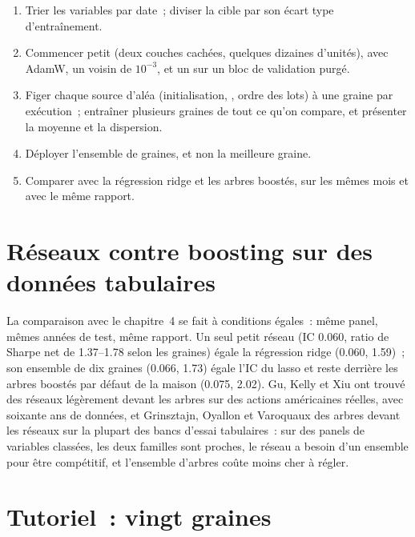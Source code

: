 \begin{method}\label{met:ml:nets:training}
\begin{enumerate}
\item Trier les variables par date~; diviser la cible par son écart type d'entraînement.
\item Commencer petit (deux couches cachées, quelques dizaines d'unités), avec AdamW, un  voisin de $10^{-3}$, et un  sur un
bloc de validation purgé.
\item Figer chaque source d'aléa (initialisation, , ordre des lots) à une graine par exécution~; entraîner plusieurs graines de
tout ce qu'on compare, et présenter la moyenne et la dispersion.
\item Déployer l'ensemble de graines, et non la meilleure graine.
\item Comparer avec la régression ridge et les arbres boostés, sur les mêmes mois et avec le même rapport.
\end{enumerate}
\end{method}

\section{Réseaux contre boosting sur des données tabulaires}

La comparaison avec le chapitre~4 se fait à conditions égales~: même panel, mêmes années de test, même rapport. Un seul petit réseau
(IC 0.060, ratio de Sharpe net de 1.37--1.78 selon les graines) égale la régression ridge (0.060, 1.59)~; son ensemble de dix graines
(0.066, 1.73) égale l'IC du lasso et reste derrière les arbres boostés par défaut de la maison (0.075, 2.02). Gu, Kelly et Xiu ont trouvé
des réseaux légèrement devant les arbres sur des actions américaines réelles, avec soixante ans de données, et Grinsztajn, Oyallon et Varoquaux des arbres
devant les réseaux sur la plupart des bancs d'essai tabulaires~: sur des panels de variables classées, les deux familles sont proches, le
réseau a besoin d'un ensemble pour être compétitif, et l'ensemble d'arbres coûte moins cher à régler.

\section{Tutoriel~: vingt graines}\label{tut:ml:neural-networks-for-noisy-tabular-data:tut}

